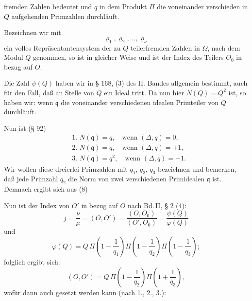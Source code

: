 fremden Zahlen bedeutet und $q$ in dem Produkt $\Pi$ die voneinander
 verschieden in $Q$ aufgehenden Primzahlen durchläuft.

Bezeichnen wir mit
\[
\varrho_1, \varrho_2, \ldots, \varrho_\nu
\]
ein volles Repräsentantensystem der zu $Q$ teilerfremden Zahlen
in $\Omega$, nach dem Modul $Q$ genommen, so ist in gleicher Weise
und
ist der Index des Teilers $O_0$ in bezug auf $O$.

Die Zahl $\psi(Q)$ haben wir in § 168, (3) des II. Bandes allgemein
 bestimmt, auch für den Fall, daß an Stelle von $Q$ ein
Ideal tritt. Da nun hier $N(Q) = Q^2$ ist, so haben wir:
wenn $\mathfrak{q}$ die voneinander verschiedenen idealen Primteiler von $Q$
durchläuft.

Nun ist (§ 92)
\[
\begin{aligned}
&\text{1. } N(\mathfrak{q}) = q, \quad \text{wenn } (\Delta,q) = 0,\\
&\text{2. } N(\mathfrak{q}) = q, \quad \text{wenn } (\Delta,q) = +1,\\
&\text{3. } N(\mathfrak{q}) = q^2, \quad \text{wenn } (\Delta,q) = -1.
\end{aligned}
\]
Wir wollen diese dreierlei Primzahlen mit $q_1$, $q_2$, $q_3$ bezeichnen
 und bemerken, daß jede Primzahl $q_2$ die Norm von
zwei verschiedenen Primidealen $\mathfrak{q}$ ist. Demnach ergibt sich aus (8)

Nun ist der Index von $O'$ in bezug auf $O$ nach Bd.\,II, § 2 (4):
\[
j = \frac{\nu}{\mu} = (O, O') = \frac{(O, O_0)}{(O', O_0)} = \frac{\psi(Q)}{\varphi(Q)}
\]
und
\[
\varphi(Q) = Q\, \Pi\left(1 - \frac{1}{q_1}\right) \Pi\left(1 - \frac{1}{q_2}\right) \Pi\left(1 - \frac{1}{q_3}\right);
\]
folglich ergibt sich:
\[
(O, O') = Q\, \Pi\left(1 - \frac{1}{q_2}\right) \Pi\left(1 + \frac{1}{q_3}\right),
\]
wofür dann auch gesetzt werden kann (nach 1., 2., 3.):
